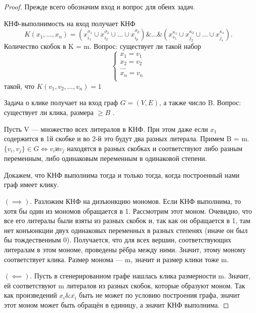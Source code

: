 \begin{proof}
Прежде всего обозначим вход и вопрос для обеих задач. 

КНФ-выполнимость на вход получает КНФ \[
K(x_1,\ldots,x_n) = \left(x_{i_1}^{\sigma_1} \cup x_{i_2}^{\sigma_2}\cup\ldots\cup
x_{i_p}^{\sigma_p}\right) \&\ldots\&\left( x_{s_1}^{\kappa_1} \cup
x_{j_2}^{\kappa_2}\cup\ldots\cup x_{j_s}^{\kappa_s} \right)
.\] 
Количество скобок в K = m. Вопрос: существует ли такой набор \[
\begin{cases}
	x_1 = v_1\\
	x_2=v_2\\
	\ldots\\
	x_n = v_n\\
\end{cases}
\] такой, что $K(v_1, v_2,\ldots,v_n) = 1$

Задача о клике получает на вход граф $G = (V, E)$, а также число B. Вопрос:
существует ли клика, размера $\ge B$ . 

Пусть V --- множество всех литералов в КНФ. При этом даже если $x_1$
содержится в 1й скобке и во 2-й это будут два разных литерала. Примем B = m.
$\{v_i, v_j\} \in G \Leftrightarrow v_i \text{и} v_j$ находятся в разных скобках
и соответствуют либо разным переменным, либо одинаковым переменным в одинаковой
степени.

Докажем, что КНФ выполнима тогда и только тогда, когда построенный нами граф
имеет клику. 

$(\implies)$. Разложим КНФ на дизъюнкцию мономов. Если КНФ выполнима, то хотя бы один из
мономов обращается в 1. Рассмотрим этот моном. Очевидно, что все его литералы
были взяты из разных скобок и, так как он обращается в 1, там нет конъюнкции
двух одинаковых переменных в разных степенях (иначе он был бы тождественным 0).
Получается, что для всех вершин, соответствующих литералам в этом мономе,
проведены рёбра между ними. Значит, этому моному соответствует клика. Размер
монома --- m, значит и размер клики тоже m.

$\left( \impliedby \right) $. Пусть в сгенерированном графе нашлась клика
размерности m. Значит, ей соответствуют m литералов из разных скобок, которые
образуют моном. Так как произведений $x_i \& \overline{x_i}$ быть не может по
условию построения графа, значит этот моном может быть обращён в единицу, а
значит КНФ выполнима.

\end{proof}

